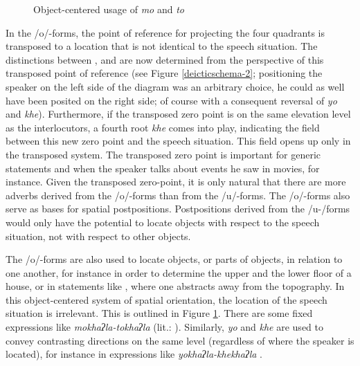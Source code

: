 \bigskip

\begin{figure}
\centering
\setlength{\fboxsep}{0pt}
\caption{Object-centered usage of \emph{mo} and \emph{to}}\label{deicticschema-3}
\end{figure}


In the /o/-forms, the point of reference for  projecting the four quadrants is transposed to a location that is not identical to the speech situation. The distinctions between ,  and  are now determined from the perspective of this transposed point of reference (see Figure \ref{deicticschema-2}; positioning  the speaker on the left side of the diagram was an arbitrary choice, he could as well have been posited on the right side; of course with a consequent reversal of \emph{yo} and \emph{khe}). Furthermore, if the transposed zero point is on the same elevation level as the interlocutors, a fourth root \emph{khe} comes into play, indicating the field between this new zero point and the speech situation. This field opens up only in the transposed system. The transposed zero point is important for generic statements and when the speaker talks about events he saw in movies, for instance. Given the transposed zero-point, it is only natural that there are more adverbs derived from the /o/-forms than from the /u/-forms. The  /o/-forms also serve as bases for spatial postpositions. Postpositions derived from the /u-/forms would only have the potential to locate objects with respect to the speech situation, not with respect to other objects.

The /o/-forms are also used to locate objects, or parts of objects, in relation to one another, for instance in order to determine the upper and the lower floor of a house, or in statements like , where one abstracts away from the topography. In this object-centered system of spatial orientation, the location of the speech situation is irrelevant.  This is outlined in Figure \ref{deicticschema-3}.  There are some fixed expressions like \emph{mokhaʔla-tokhaʔla}  (lit.: ). Similarly, \emph{yo} and \emph{khe} are used to convey contrasting directions on the same level (regardless of where the speaker is located), for instance in expressions like \emph{yokhaʔla-khekhaʔla} .

